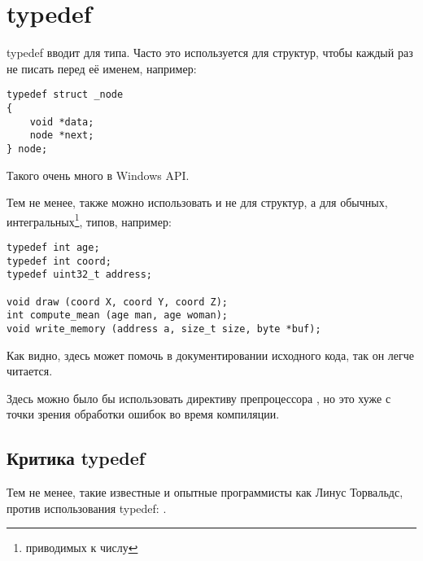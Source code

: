 ﻿\section{typedef}

typedef вводит  для типа. Часто это используется для структур, чтобы каждый раз не писать 
перед её именем, например:

\begin{lstlisting}
typedef struct _node
{
	void *data;
	node *next;
} node;
\end{lstlisting}

Такого очень много в Windows API.

Тем не менее,  также можно использовать и не для структур, а для обычных, 
интегральных\footnote{приводимых к числу}, типов, например:

\begin{lstlisting}
typedef int age;
typedef int coord;
typedef uint32_t address;

void draw (coord X, coord Y, coord Z);
int compute_mean (age man, age woman);
void write_memory (address a, size_t size, byte *buf);
\end{lstlisting}

Как видно,  здесь может помочь в документировании исходного кода, так он легче читается.

Здесь можно было бы использовать директиву препроцессора , но это хуже с точки зрения обработки ошибок во время компиляции.

\subsection{Критика typedef}

Тем не менее, такие известные и опытные программисты как Линус Торвальдс, против использования typedef:
\cite{Torvalds:2002}.

